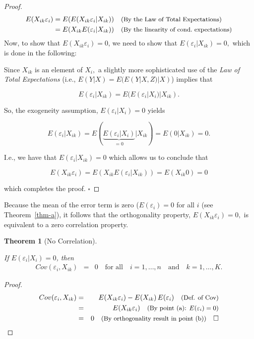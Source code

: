 \documentclass[
  letterpaper,
  DIV=11,
  numbers=noendperiod]{scrreprt}
\theoremstyle{definition}
\theoremstyle{plain}
\newtheorem{theorem}{Theorem}[chapter]
\theoremstyle{plain}
\theoremstyle{remark}
\begin{document}
\begin{proof}

\begin{align*}
E(X_{ik}\varepsilon_i)
&=E(E(X_{ik}\varepsilon_i|X_{ik}))\quad{\small\text{(By the Law of Total Expectations)}}\\
&=E(X_{ik}E(\varepsilon_i|X_{ik}))\quad{\small\text{(By the linearity of cond.~expectations)}}
\end{align*} Now, to show that \(E(X_{ik}\varepsilon_i)=0\), we need to
show that \(E(\varepsilon_i|X_{ik})=0,\) which is done in the following:

Since \(X_{ik}\) is an element of \(X_i,\) a slightly more sophisticated
use of the \emph{Law of Total Expectations} (i.e.,
\(E(Y|X)=E(E(Y|X,Z)|X)\)) implies that

\[
E(\varepsilon_i|X_{ik})=E(E(\varepsilon_i|X_i)|X_{ik}).
\]

So, the exogeneity assumption, \(E(\varepsilon_i|X_i)=0\) yields

\[
E(\varepsilon_i|X_{ik})=E(\underbrace{E(\varepsilon_i|X_i)}_{=0}|X_{ik})=E(0|X_{ik})=0.
\]

I.e., we have that \(E(\varepsilon_i|X_{ik})=0\) which allows us to
conclude that

\[
E(X_{ik}\varepsilon_i)=E(X_{ik}E(\varepsilon_i|X_{ik}))=E(X_{ik}0)=0
\]

which completes the proof. \(\square\)

\end{proof}

Because the mean of the error term is zero (\(E(\varepsilon_i)=0\) for
all \(i\) (see Theorem~\ref{thm-a}), it follows that the orthogonality
property, \(E(X_{ik}\varepsilon_i)=0,\) is equivalent to a zero
correlation property.

\leavevmode{}%
\begin{theorem}[No Correlation]\label{thm-c}

If \(E(\varepsilon_i|X_{i})=0\), then \begin{eqnarray*}
  Cov(\varepsilon_i,X_{ik})&=&0\quad\text{for all}\quad i=1,\dots,n\quad\text{and}\quad k=1,\dots,K.
\end{eqnarray*}

\end{theorem}

\begin{proof}

\begin{eqnarray*}
  Cov(\varepsilon_i,X_{ik})&=&E(X_{ik}\varepsilon_i)-E(X_{ik})\,E(\varepsilon_i)\quad{\small\text{(Def. of Cov)}}\\
  &=&E(X_{ik}\varepsilon_i)\quad{\small\text{(By point (a): $E(\varepsilon_i)=0$)}}\\
  &=&0\quad{\small\text{(By orthogonality result in point (b))}}\quad\square
\end{eqnarray*}

\end{proof}
\end{document}
